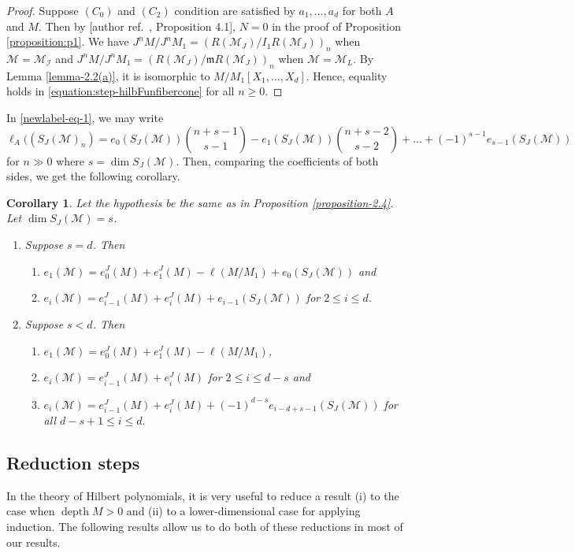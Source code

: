 \documentclass[10pt,a4paper]{amsart}
\newtheorem{corollary}{Corollary}
\def\I{{\mathcal I}}
\def\M{{\mathcal M}}
\DeclareMathOperator{\depth}{depth}
\newcommand{\m}{\mathfrak m}
\renewcommand{\cite}[2][]{\textup{[author ref.\ \texttt{\detokenize{#2}}\if\relax\detokenize{#1}\relax\else, #1\fi]}}
\begin{document}
\begin{proof} Suppose $(C_0)$ and $(C_2)$ condition are satisfied by $a_1,\ldots,a_d$ for both $A$ and $M$. Then by \cite[Proposition 4.1]{trung-abs}, $N=0$ in the proof of Proposition \ref{proposition:p1}. We have $J^nM/J^n M_1= (R(\M_J)/I_1 R(\M_J))_n$ when $\M=\M_\I$ and $J^nM/J^n M_1= (R(\M_J)/\m R(\M_J))_n$ when $\M=\M_L$. By Lemma \ref{lemma-2.2(a)}, it is isomorphic to $M/M_1[X_1,\ldots,X_d]$.  Hence, equality holds in
	\eqref{equation:step-hilbFunfibercone} for all $n\geq 0.$
\end{proof}
In \eqref{newlabel-eq-1}, we may write
$$\ell_A((S_J(\M)_n)=e_0(S_J(\M))\binom{n+s-1}{s-1}-e_1(S_J(\M))\binom{n+s-2}{s-2}+\ldots+(-1)^{s-1}e_{s-1}(S_J(\M))$$
for $n\gg 0$ where $s=\dim S_J(\M)$. Then, comparing the coefficients of both sides, we get the following corollary.
\begin{corollary}\label{corr-2.5}
Let the hypothesis be the same as in Proposition \ref{proposition-2.4}. Let $\dim S_J(\M)=s$. 
	\begin{enumerate}[label=(\roman*)]
		\item Suppose $s=d$. Then 
		\begin{enumerate}
			\item $e_1(\M)=e_0^J(M)+e_1^J(M)-\ell(M/M_1)+e_0(S_J(\M))$ and 
			\item $e_i(\M)=e_{i-1}^J(M)+e_i^J(M)+e_{i-1}(S_J(\M))$ for $2\leq i\leq d$.
		\end{enumerate}
		\item Suppose $s<d$. Then 
		\begin{enumerate}
			\item $e_1(\M)=e_0^J(M)+e_1^J(M)-\ell(M/M_1)$,
			\item $e_i(\M)=e_{i-1}^J(M)+e_i^J(M)$ for $2\leq i\leq d-s$ and
			\item $e_i(\M)=e_{i-1}^J(M)+e_i^J(M)+(-1)^{d-s}e_{i-d+s-1}(S_J(\M))$ for all $d-s+1\leq i\leq d.$
		\end{enumerate}
	\end{enumerate}
\end{corollary}
\subsection{Reduction steps} In the theory of Hilbert polynomials, it is very useful to reduce a result (i) to the case when $\depth M>0$ and (ii) to a lower-dimensional case for applying induction. The following results allow us to do both of these reductions in most of our results.
\end{document}
